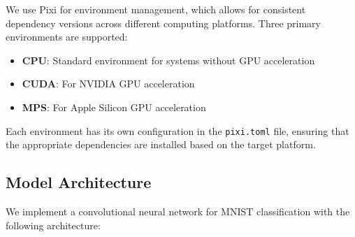 \documentclass[
]{article}
\providecommand{\tightlist}{%
  \setlength{\itemsep}{0pt}\setlength{\parskip}{0pt}}\usepackage{longtable,booktabs,array}
\begin{document}
We use Pixi for environment management, which allows for consistent
dependency versions across different computing platforms. Three primary
environments are supported:

\begin{itemize}
\tightlist
\item
  \textbf{CPU}: Standard environment for systems without GPU
  acceleration
\item
  \textbf{CUDA}: For NVIDIA GPU acceleration
\item
  \textbf{MPS}: For Apple Silicon GPU acceleration
\end{itemize}

Each environment has its own configuration in the \texttt{pixi.toml}
file, ensuring that the appropriate dependencies are installed based on
the target platform.

\subsection{Model Architecture}\label{model-architecture}

We implement a convolutional neural network for MNIST classification
with the following architecture:
\end{document}
